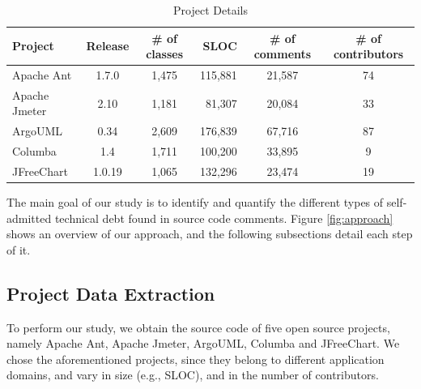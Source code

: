 \begin{table}[!hbt]
      \begin{center}
            \caption{Project Details}
            \label{tab:project_details}
            \begin{tabular}{l| c c r c c }
            \toprule
            \textbf{Project}   & \textbf{Release}  & \textbf{\# of classes}   & \textbf{SLOC}    & \textbf{\# of comments}  & \textbf{\# of contributors} \\ \midrule 
              Apache Ant       & 1.7.0             &  1,475                   & 115,881          & 21,587                   & 74  \\                       
              Apache Jmeter    & 2.10              &  1,181                   &  81,307          & 20,084                   & 33  \\                         
              ArgoUML          & 0.34              &  2,609                   & 176,839          & 67,716                   & 87  \\               
              Columba          & 1.4               &  1,711                   & 100,200          & 33,895                   & 9   \\                   
              JFreeChart       & 1.0.19            &  1,065                   & 132,296          & 23,474                   & 19  \\ \bottomrule
            \end{tabular}
      \end{center}
\end{table}

The main goal of our study is to identify and quantify the different types of self-admitted technical debt found in source code comments. Figure \ref{fig:approach} shows an overview of our approach, and the following subsections detail each step of it.

\subsection{Project Data Extraction} %
\label{sub:project_data_extraction}

To perform our study, we obtain the source code of five open source projects, namely Apache Ant, Apache Jmeter, ArgoUML, Columba and JFreeChart. We chose the aforementioned projects, since they belong to different application domains, and vary in size (e.g., SLOC), and in the number of contributors.

